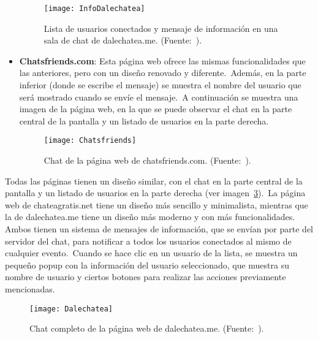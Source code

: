 \begin{itemize}
	\begin{figure}[H]
		\centering
		\hspace{1.5cm}
		\texttt{[image: InfoDalechatea]}
		\caption{Lista de usuarios conectados y mensaje de información en una sala de chat de dalechatea.me.
			(Fuente:~\cite{DaleChat:online}).}
		\label{fig:UsuariosEInfoDalechatea}
	\end{figure}

	\item \textbf{Chatsfriends.com}: Esta página web ofrece las mismas funcionalidades que las anteriores, pero
	con un diseño renovado y diferente.\ Además, en la parte inferior (donde se escribe el mensaje) se muestra
	el nombre del usuario que será mostrado cuando se envíe el mensaje.\ A continuación se muestra una imagen
	de la página web, en la que se puede observar el chat en la parte central de la pantalla y un listado de
	usuarios en la parte derecha.

	\begin{figure}[H]
		\centering
		\texttt{[image: Chatsfriends]}
		\caption{Chat de la página web de chatsfriends.com. (Fuente:~\cite{chatsfriends:online}).}
		\label{fig:Chatsfriends}
	\end{figure}
\end{itemize}
\label{itm:estadoDelArte}

Todas las páginas tienen un diseño similar, con el chat en la parte central de la pantalla y un listado de usuarios
en la parte derecha (ver imagen~\ref{fig:chatCompleto}).\ La página web de chateagratis.net tiene un diseño más
sencillo y minimalista, mientras que la de dalechatea.me tiene un diseño más moderno y con más funcionalidades.
Ambos tienen un sistema de mensajes de información, que se envían por parte del servidor del chat, para notificar a
todos los usuarios conectados al mismo de cualquier evento.\ Cuando se hace clic en un usuario de la lista, se
muestra un pequeño popup con la información del usuario seleccionado, que muestra su nombre de usuario y ciertos
botones para realizar las acciones previamente mencionadas.


\begin{figure}[H]
	\centering
	\texttt{[image: Dalechatea]}
	\caption{Chat completo de la página web de dalechatea.me. (Fuente:~\cite{DaleChat:online}).}
	\label{fig:chatCompleto}
\end{figure}


